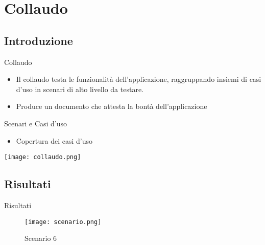 \section{Collaudo}
\subsection{Introduzione}
\begin{frame}{Collaudo}
\begin{itemize}
\item Il collaudo testa le funzionalità dell'applicazione, raggruppando insiemi di casi d'uso in scenari di alto livello da testare.
\vspace{0.8em}
\item Produce un documento che attesta la bontà dell'applicazione
\end{itemize}

\end{frame}

\begin{frame}{Scenari e Casi d'uso}

\begin{itemize}
\item Copertura dei casi d'uso
\end{itemize}

\begin{center}
\texttt{[image: collaudo.png]}
\end{center}

\end{frame}

\subsection{Risultati}
\begin{frame}{Risultati}
\centering
\begin{figure}
\texttt{[image: scenario.png]}
\caption{Scenario 6}
\end{figure}

\end{frame}

